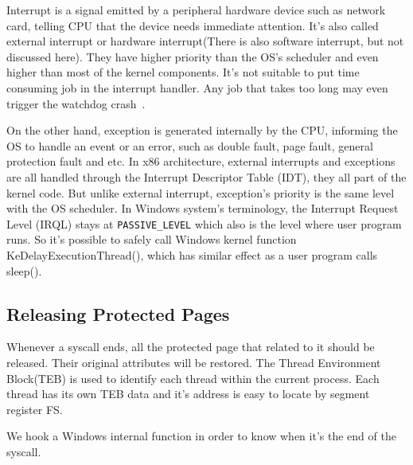 Interrupt is a signal emitted by a peripheral hardware device such as network card, telling CPU that the device needs immediate attention. It's also called external interrupt or hardware interrupt(There is also software interrupt, but not discussed here). They have higher priority than the OS's scheduler and even higher than most of the kernel components. It's not suitable to put time consuming job in the interrupt handler. Any job that takes too long may even trigger the watchdog crash~\cite{msdnwatchdog}.   

On the other hand, exception is generated internally by the CPU, informing the OS to handle an event or an error, such as double fault, page fault, general protection fault and etc. In x86 architecture, external interrupts and exceptions are all handled through the Interrupt Descriptor Table (IDT), they all part of the kernel code. But unlike external interrupt, exception's priority is the same level with the OS scheduler. In Windows system's terminology, the Interrupt Request Level (IRQL) stays at \texttt{PASSIVE\_LEVEL} which also is the level where user program runs. So it's possible to safely call Windows kernel function KeDelayExecutionThread(), which has similar effect as a user program calls sleep(). 


\subsection{Releasing Protected Pages}

Whenever a syscall ends, all the protected page that related to it should be released. Their original attributes will be restored. The Thread Environment Block(TEB) is used to identify each thread within the current process. Each thread has its own TEB data and it's address is easy to locate by segment register FS. 

We hook a Windows internal function in order to know when it's the end of the syscall. 

